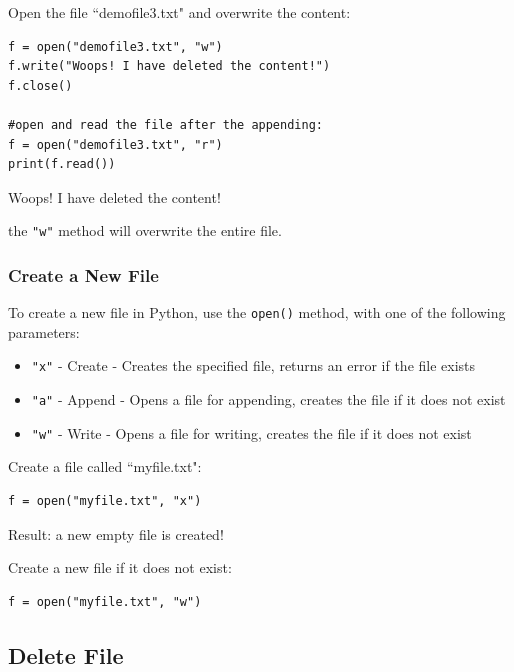 \documentclass[12pt,a4paper]{article}
\newcommand{\code}[1]{%
	\colorbox{backcolour}{\lstinline{#1}}%
}
\newcommand{\lcode}[1]{%
	\lstinline{#1}%
}
\begin{document}
\begin{ebox}
Open the file ``demofile3.txt" and overwrite the content:
	\begin{lstlisting}
f = open("demofile3.txt", "w")
f.write("Woops! I have deleted the content!")
f.close()

#open and read the file after the appending:
f = open("demofile3.txt", "r")
print(f.read())
	\end{lstlisting}
\tcblower
	\begin{vercode}
Woops! I have deleted the content!
	\end{vercode}
\end{ebox}

\begin{nbox}
	the \lcode{"w"} method will overwrite the entire file.
\end{nbox}
\subsubsection{Create a New File}

To create a new file in Python, use the \code{open()} method, with one of the
following parameters:

\begin{itemize}
	\item \code{"x"} - Create - Creates the specified file, returns an error if the file exists
	\item \code{"a"} - Append - Opens a file for appending, creates the file if it does not exist
	\item \code{"w"} - Write - Opens a file for writing, creates the file if it does not exist
\end{itemize}

\begin{ebox}
Create a file called ``myfile.txt":
	\begin{lstlisting}
f = open("myfile.txt", "x")
	\end{lstlisting}
\end{ebox}

Result: a new empty file is created!

\begin{ebox}
Create a new file if it does not exist:
	\begin{lstlisting}
f = open("myfile.txt", "w")
	\end{lstlisting}
\end{ebox}
\subsection{Delete File}
\end{document}
